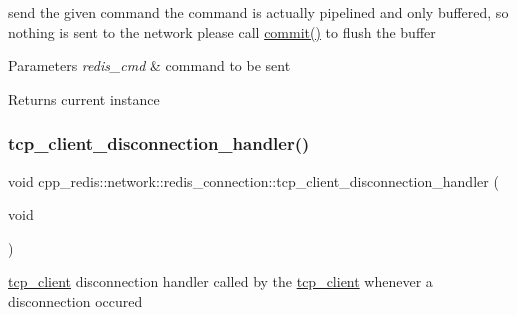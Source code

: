 send the given command the command is actually pipelined and only buffered, so nothing is sent to the network please call \hyperlink{classcpp__redis_1_1network_1_1redis__connection_a8e6980d40139877c16e995051b780d60}{commit()} to flush the buffer


\begin{DoxyParams}{Parameters}
{\em redis\+\_\+cmd} & command to be sent \\
\hline
\end{DoxyParams}
\begin{DoxyReturn}{Returns}
current instance 
\end{DoxyReturn}
\mbox{\label{classcpp__redis_1_1network_1_1redis__connection_a9d504600a38af881fdc0757e19a8e753}} 
\subsubsection{\texorpdfstring{tcp\+\_\+client\+\_\+disconnection\+\_\+handler()}{tcp\_client\_disconnection\_handler()}}
{\footnotesize\ttfamily void cpp\+\_\+redis\+::network\+::redis\+\_\+connection\+::tcp\+\_\+client\+\_\+disconnection\+\_\+handler (\begin{DoxyParamCaption}\item[{void}]{ }\end{DoxyParamCaption})\hspace{0.3cm}{\ttfamily [private]}}

\hyperlink{classcpp__redis_1_1network_1_1tcp__client}{tcp\+\_\+client} disconnection handler called by the \hyperlink{classcpp__redis_1_1network_1_1tcp__client}{tcp\+\_\+client} whenever a disconnection occured \mbox{\label{classcpp__redis_1_1network_1_1redis__connection_a6382aa1f13a25bcccf927476d41968c8}} 
